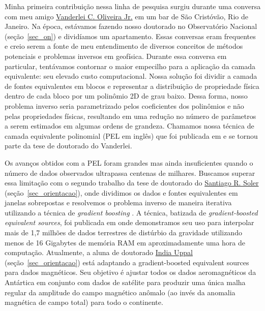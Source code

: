 \documentclass[10pt,a4paper,oneside]{book}
\newcommand{\SantiagoLink}{\href{https://www.santisoler.com/}{Santiago R. Soler}}
\newcommand{\VanderleiLink}{\href{https://www.pinga-lab.org/people/oliveira-jr.html}{Vanderlei C. Oliveira Jr.}}
\newcommand{\IndiaLink}{\href{https://www.compgeolab.org/team/\#indiauppal}{India Uppal}}
\begin{document}
Minha primeira contribuição nessa linha de pesquisa surgiu durante uma conversa
com meu amigo \VanderleiLink{} em um bar de São Cristóvão, Rio de Janeiro.
Na época, estávamos fazendo nosso doutorado no Observatório Nacional
(seção~\ref{sec_on}) e dividíamos um apartamento.
Essas conversas eram frequentes e creio serem a fonte de meu entendimento de
diversos conceitos de métodos potenciais e problemas inversos em geofísica.
Durante essa conversa em particular, tentávamos contornar o maior empecilho
para a aplicação da camada equivalente: seu elevado custo computacional.
Nossa solução foi dividir a camada de fontes equivalentes em blocos e
representar a distribuição de propriedade física dentro de cada bloco por um
polinômio 2D de grau baixo.
Dessa forma, nosso problema inverso seria parametrizado pelos coeficientes dos
polinômios e não pelas propriedades físicas, resultando em uma redução no
número de parâmetros a serem estimados em algumas ordens de grandeza.
Chamamos nossa técnica de camada equivalente polinomial (PEL em inglês) que foi
publicada em \citet{OliveiraJr2013} e se tornou parte da tese de doutorado do
Vanderlei.

Os avanços obtidos com a PEL foram grandes mas ainda insuficientes quando o
número de dados observados ultrapassa centenas de milhares.
Buscamos superar essa limitação com o segundo trabalho da tese de doutorado
do \SantiagoLink{} (seção~\ref{sec_orientacao}), onde dividimos os dados e
fontes equivalentes em janelas sobrepostas e resolvemos o problema inverso de
maneira iterativa utilizando a técnica de \textit{gradient boosting}
\citep{Friedman2001}.
A técnica, batizada de \textit{gradient-boosted equivalent sources}, foi
publicada em \citet{Soler2021} onde demonstramos seu uso para interpolar
mais de 1,7 milhões de dados terrestres de distúrbio da gravidade utilizando
menos de 16 Gigabytes de memória RAM em aproximadamente uma hora de computação.
Atualmente, a aluna de doutorado \IndiaLink{} (seção~\ref{sec_orientacao})
está adaptando a gradient-boosted equivalent sources para dados magnéticos.
Seu objetivo é ajustar todos os dados aeromagnéticos da Antártica em conjunto
com dados de satélite para produzir uma única malha regular da amplitude do
campo magnético anômalo (ao invés da anomalia magnética de campo total) para
todo o continente.
\end{document}

